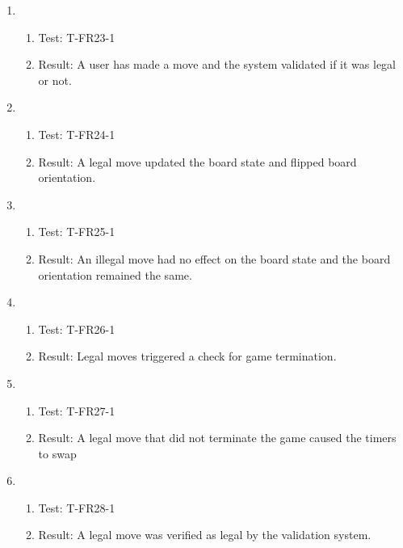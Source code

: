 \documentclass[12pt, titlepage]{article}
\begin{document}
\begin{enumerate}[\indent {}]
        \item 
            \begin{enumerate}[ ]
                \item Test: T-FR23-1
                \item Result: A user has made a move and the system validated if it was legal or not.
            \end{enumerate}
            
        \item 
            \begin{enumerate}[ ]
                \item Test: T-FR24-1
                \item Result: A legal move updated the board state and flipped board orientation.
            \end{enumerate}
            
        \item 
            \begin{enumerate}[ ]
                \item Test: T-FR25-1
                \item Result: An illegal move had no effect on the board state and the board orientation remained the same.
            \end{enumerate}
            
        \item 
            \begin{enumerate}[ ]
                \item Test: T-FR26-1
                \item Result: Legal moves triggered a check for game termination.
            \end{enumerate}
            
        \item 
            \begin{enumerate}[ ]
                \item Test: T-FR27-1
                \item Result: A legal move that did not terminate the game caused the timers to swap
            \end{enumerate}
            
        \item 
            \begin{enumerate}[ ]
                \item Test: T-FR28-1
                \item Result: A legal move was verified as legal by the validation system.
            \end{enumerate}
        

\end{enumerate}
\end{document}
